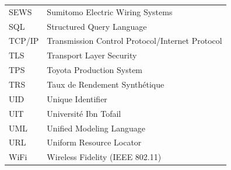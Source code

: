 \begin{longtable}{@{}p{3cm}p{11cm}@{}}
SEWS & Sumitomo Electric Wiring Systems \\
SQL & Structured Query Language \\
TCP/IP & Transmission Control Protocol/Internet Protocol \\
TLS & Transport Layer Security \\
TPS & Toyota Production System \\
TRS & Taux de Rendement Synthétique \\
UID & Unique Identifier \\
UIT & Université Ibn Tofail \\
UML & Unified Modeling Language \\
URL & Uniform Resource Locator \\
WiFi & Wireless Fidelity (IEEE 802.11) \\

\end{longtable}
\clearpage
